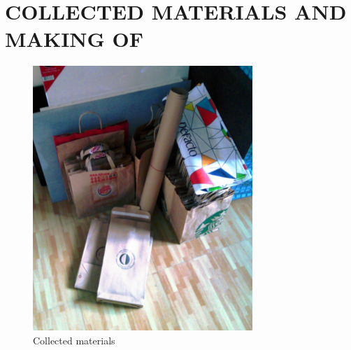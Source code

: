 \chapter{COLLECTED MATERIALS AND MAKING OF}


\begin{figure}[h!]
  \centering
  \includegraphics[height=10cm]{project_graphics/collected_all_together.jpg}
  \caption{Collected materials}
  \label{fig:CollectedAllTogether}
\end{figure}

